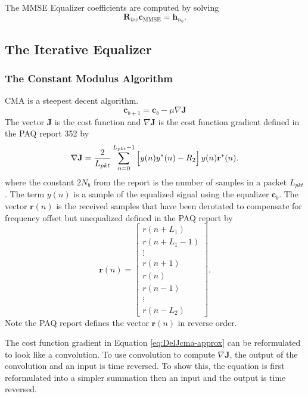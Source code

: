 The MMSE Equalizer coefficients are computed by solving
\begin{equation}
\mathbf{R}_{hw}\mathbf{c}_\text{MMSE} = \mathbf{h}_{n_0}.
\label{eq:c_MMSE_solve}
\end{equation}
\clearpage
\subsection{The Iterative Equalizer}

\subsubsection{The Constant Modulus Algorithm}
CMA is a steepest decent algorithm.
\begin{equation}
\mathbf{c}_{b+1} = \mathbf{c}_{b}-\mu \nabla \mathbf{J}
\end{equation}
The vector $\mathbf{J}$ is the cost function and $\nabla \mathbf{J}$ is the cost function gradient defined in the PAQ report 352 by
\begin{equation}
	\nabla \mathbf{J} = \frac{2}{L_{pkt}} \sum_{n=0}^{L_{pkt}-1}
	\left[ \vphantom{\displaystyle\sum}  y(n) y^\ast(n) - R_2 \right]
	y(n)  \mathbf{r}^\ast(n).
\label{eq:DelJcma-approx}
\end{equation}
where the constant $2N_b$ from the report is the number of samples in a packet $L_{pkt}$.
The term $y(n)$ is a sample of the equalized signal using the equalizer $\mathbf{c}_{b}$. The vector $\mathbf{r}(n)$ is the received samples that have been derotated to compensate for frequency offset but unequalized defined in the PAQ report by 
\begin{equation}
\mathbf{r}(n) = \begin{bmatrix} r(n+L_1) \\ r(n+L_1-1) \\ \vdots \\ r(n+1) \\ r(n) \\ r(n-1) \\ \vdots \\ r(n-L_2) \end{bmatrix}.
\end{equation}
Note the PAQ report defines the vector $\mathbf{r}(n)$ in reverse order.

The cost function gradient in Equation \eqref{eq:DelJcma-approx} can be reformulated to look like a convolution.
To use convolution to compute $\nabla \mathbf{J}$, the output of the convolution and an input is time reversed.
To show this, the equation is first reformulated into a simpler summation then an input and the output is time reversed.

